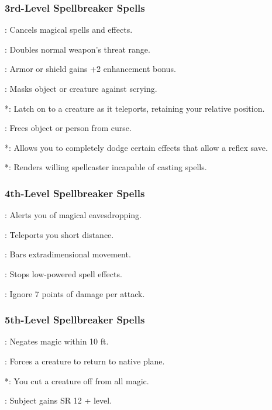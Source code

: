 \subsubsection{3rd-Level Spellbreaker Spells}
\begin{list}{}{\leftmargin=1em}
  \item {}: Cancels magical spells and effects.
  \item {}: Doubles normal weapon's threat range.
  \item {}: Armor or shield gains +2 enhancement bonus.
  \item {}: Masks object or creature against scrying.
  \item {}*: Latch on to a creature as it teleports, retaining your relative position.
  \item {}: Frees object or person from curse.
  \item {}*: Allows you to completely dodge certain effects that allow a reflex save.
  \item {}*: Renders willing spellcaster incapable of casting spells.
\end{list}
\subsubsection{4th-Level Spellbreaker Spells}
\begin{list}{}{\leftmargin=1em}
  \item {}: Alerts you of magical eavesdropping.
  \item {}: Teleports you short distance.
  \item {}: Bars extradimensional movement.
  \item {}: Stops low-powered spell effects.
  \item {}: Ignore 7 points of damage per attack.
\end{list}
\subsubsection{5th-Level Spellbreaker Spells}
\begin{list}{}{\leftmargin=1em}
  \item {}: Negates magic within 10 ft.
  \item {}: Forces a creature to return to native plane.
  \item {}*: You cut a creature off from all magic.
  \item {}: Subject gains SR 12 + level.
\end{list}